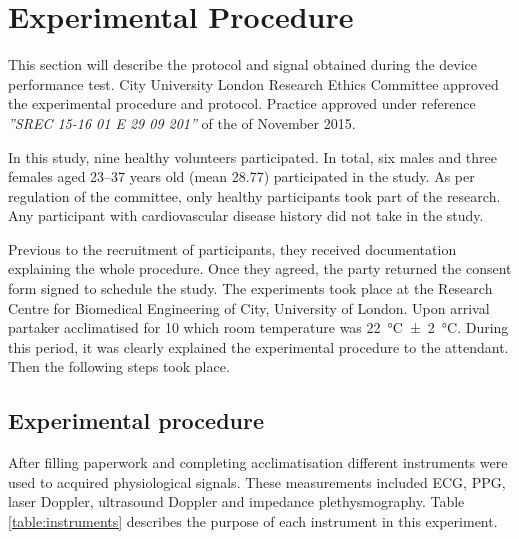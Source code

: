 
\chapter{Experimental Procedure}  %
\label{chapterprocedure}

\ifpdf
    \graphicspath{{Chapter4/Figs/Raster/}{Chapter4/Figs/PDF/}{Chapter4/Figs/}}
\else
    \graphicspath{{Chapter4/Figs/Vector/}{Chapter4/Figs/}}
\fi

This section will describe the protocol and signal obtained during the device performance test. City University London Research Ethics Committee approved the experimental procedure and protocol. Practice approved under reference \textit{''SREC 15-16 01 E 29 09 201''} of the  of November 2015. 

In this study, nine healthy volunteers participated. In total, six males and three females aged \numrange{23}{37} years old (mean 28.77) participated in the study. As per regulation of the committee, only healthy participants took part of the research. Any participant with cardiovascular disease history did not take in the study. 

Previous to the recruitment of participants, they received documentation explaining the whole procedure. Once they agreed, the party returned the consent form signed to schedule the study. The experiments took place at the Research Centre for Biomedical Engineering of City, University of London. Upon arrival partaker acclimatised for \SI{10}{\min} which room temperature was \SI{22}{\degreeCelsius}\SI{\pm 2}{\degreeCelsius}. During this period, it was clearly explained the experimental procedure to the attendant. Then the following steps took place.


\section{Experimental procedure} %
\label{section4.1}

After filling paperwork and completing acclimatisation different instruments were used to acquired physiological signals. These measurements included ECG, PPG, laser Doppler, ultrasound Doppler and impedance plethysmography. Table \ref{table:instruments} describes the purpose of each instrument in this experiment. 

